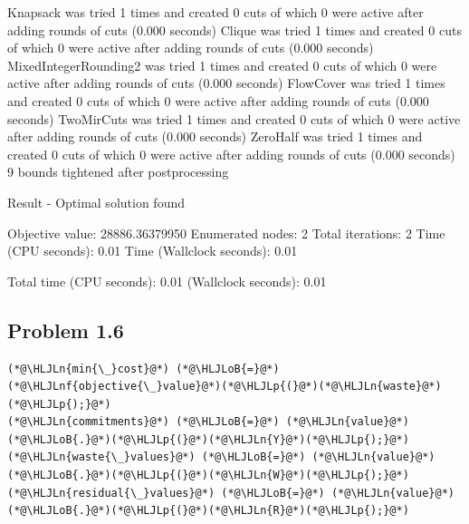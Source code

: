 \documentclass[12pt,a4paper]{article}
\newcommand{\HLJLn}[1]{#1}
\newcommand{\HLJLnf}[1]{\textcolor[RGB]{66,102,213}{#1}}
\newcommand{\HLJLoB}[1]{\textcolor[RGB]{102,102,102}{\textbf{#1}}}
\newcommand{\HLJLp}[1]{#1}
\begin{document}
Knapsack was tried 1 times and created 0 cuts of which 0 were active after adding rounds of cuts (0.000 seconds)
Clique was tried 1 times and created 0 cuts of which 0 were active after adding rounds of cuts (0.000 seconds)
MixedIntegerRounding2 was tried 1 times and created 0 cuts of which 0 were active after adding rounds of cuts (0.000 seconds)
FlowCover was tried 1 times and created 0 cuts of which 0 were active after adding rounds of cuts (0.000 seconds)
TwoMirCuts was tried 1 times and created 0 cuts of which 0 were active after adding rounds of cuts (0.000 seconds)
ZeroHalf was tried 1 times and created 0 cuts of which 0 were active after adding rounds of cuts (0.000 seconds)
9 bounds tightened after postprocessing


Result - Optimal solution found

Objective value:                28886.36379950
Enumerated nodes:               2
Total iterations:               2
Time (CPU seconds):             0.01
Time (Wallclock seconds):       0.01

Total time (CPU seconds):       0.01   (Wallclock seconds):       0.01



\subsection{Problem 1.6}

\begin{lstlisting}
(*@\HLJLn{min{\_}cost}@*) (*@\HLJLoB{=}@*) (*@\HLJLnf{objective{\_}value}@*)(*@\HLJLp{(}@*)(*@\HLJLn{waste}@*)(*@\HLJLp{);}@*)
(*@\HLJLn{commitments}@*) (*@\HLJLoB{=}@*) (*@\HLJLn{value}@*)(*@\HLJLoB{.}@*)(*@\HLJLp{(}@*)(*@\HLJLn{Y}@*)(*@\HLJLp{);}@*)
(*@\HLJLn{waste{\_}values}@*) (*@\HLJLoB{=}@*) (*@\HLJLn{value}@*)(*@\HLJLoB{.}@*)(*@\HLJLp{(}@*)(*@\HLJLn{W}@*)(*@\HLJLp{);}@*)
(*@\HLJLn{residual{\_}values}@*) (*@\HLJLoB{=}@*) (*@\HLJLn{value}@*)(*@\HLJLoB{.}@*)(*@\HLJLp{(}@*)(*@\HLJLn{R}@*)(*@\HLJLp{);}@*)
\end{lstlisting}
\end{document}
